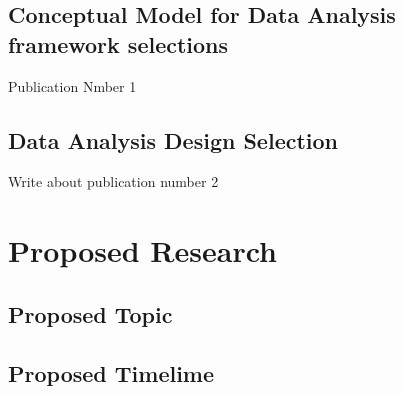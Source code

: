 \subsection{Conceptual Model for Data Analysis framework selections}

Publication Nmber 1 ~\cite{paraskevakos2018task}

\subsection{Data Analysis Design Selection}

Write about publication number 2

\section{Proposed Research}

\subsection{Proposed Topic}

\subsection{Proposed Timelime}



